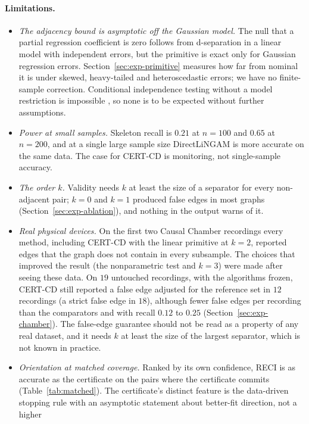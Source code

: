 \paragraph{Limitations.}
\begin{itemize}
\item \emph{The adjacency bound is asymptotic off the Gaussian model.} The
  null that a partial regression coefficient is zero follows from
  d-separation in a linear model with independent errors, but the primitive is
  exact only for Gaussian regression errors. Section~\ref{sec:exp-primitive}
  measures how far from nominal it is under skewed, heavy-tailed and
  heteroscedastic errors; we have no finite-sample correction. Conditional
  independence testing without a model restriction is impossible
  \citep{shah2020hardness}, so none is to be expected without further
  assumptions.
\item \emph{Power at small samples.} Skeleton recall is $0.21$ at $n=100$ and
  $0.65$ at $n=200$, and at a single large sample size DirectLiNGAM is more
  accurate on the same data. The case for CERT-CD is monitoring, not
  single-sample accuracy.
\item \emph{The order $k$.} Validity needs $k$ at least the size of a separator
  for every non-adjacent pair; $k=0$ and $k=1$ produced false edges in most
  graphs (Section~\ref{sec:exp-ablation}), and nothing in the output warns of it.
\item \emph{Real physical devices.} On the first two Causal Chamber recordings every
  method, including CERT-CD with the linear primitive at $k=2$, reported edges that
  the graph does not contain in every subsample. The choices that improved the
  result (the nonparametric test and $k=3$) were made after seeing these data. On
  $19$ untouched recordings, with the algorithms frozen, CERT-CD still reported a
  false edge adjusted for the reference set in $12$ recordings (a strict false edge in
  $18$), although fewer false edges per recording than the comparators and with
  recall $0.12$ to $0.25$ (Section~\ref{sec:exp-chamber}). The false-edge guarantee should
  not be read as a property of any real dataset, and it needs $k$ at least the size
  of the largest separator, which is not known in practice.
\item \emph{Orientation at matched coverage.} Ranked by its own confidence, RECI is as
  accurate as the certificate on the pairs where the certificate commits
  (Table~\ref{tab:matched}). The certificate's distinct feature is the data-driven
  stopping rule with an asymptotic statement about better-fit direction, not a higher

\end{itemize}
